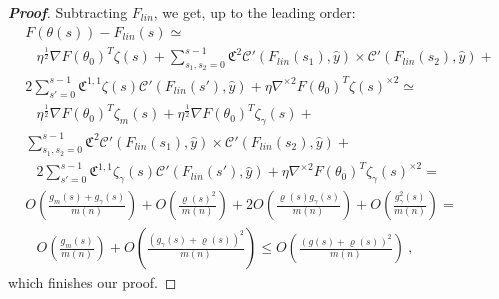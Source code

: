 \documentclass{article} %
\begin{document}
\begin{proof}[\textbf{Proof}]
Subtracting \(F_{lin}\), we get, up to the leading order:
\begin{equation}
\begin{array}{c}
F\left(\theta\left(s\right)\right)-F_{lin}\left(s\right)\simeq\\
\begin{array}{c}
\\
\\
\end{array}\eta^{\frac{1}{2}}\nabla F\left(\theta_{0}\right)^{T}\zeta\left(s\right)+\sum_{s_{1},s_{2}=0}^{s-1}\mathfrak{C}^{2}\mathcal{C}'\left(F_{lin}\left(s_{1}\right),\hat{y}\right)\times\mathcal{C}'\left(F_{lin}\left(s_{2}\right),\hat{y}\right)+\\
2\sum_{s'=0}^{s-1}\mathfrak{C}^{1,1}\zeta\left(s\right)\mathcal{C}'\left(F_{lin}\left(s'\right),\hat{y}\right)+\eta\nabla^{\times2}F\left(\theta_{0}\right)^{T}\zeta\left(s\right)^{\times2}\simeq\\
\begin{array}{c}
\\
\\
\end{array}\eta^{\frac{1}{2}}\nabla F\left(\theta_{0}\right)^{T}\zeta_{m}\left(s\right)+\eta^{\frac{1}{2}}\nabla F\left(\theta_{0}\right)^{T}\zeta_{\gamma}\left(s\right)+\\
\sum_{s_{1},s_{2}=0}^{s-1}\mathfrak{C}^{2}\mathcal{C}'\left(F_{lin}\left(s_{1}\right),\hat{y}\right)\times\mathcal{C}'\left(F_{lin}\left(s_{2}\right),\hat{y}\right)+\\
\begin{array}{c}
\\
\\
\end{array}2\sum_{s'=0}^{s-1}\mathfrak{C}^{1,1}\zeta_{\gamma}\left(s\right)\mathcal{C}'\left(F_{lin}\left(s'\right),\hat{y}\right)+\eta\nabla^{\times2}F\left(\theta_{0}\right)^{T}\zeta_{\gamma}\left(s\right)^{\times2}=\\
O\left(\frac{g_{m}\left(s\right)+g_{\gamma}\left(s\right)}{m\left(n\right)}\right)+O\left(\frac{\varrho\left(s\right)^{2}}{m\left(n\right)}\right)+2O\left(\frac{\varrho\left(s\right)g_{\gamma}\left(s\right)}{m\left(n\right)}\right)+O\left(\frac{g_{\gamma}^{2}\left(s\right)}{m\left(n\right)}\right)=\\
\begin{array}{c}
\\
\\
\end{array}O\left(\frac{g_{m}\left(s\right)}{m\left(n\right)}\right)+O\left(\frac{\left(g_{\gamma}\left(s\right)+\varrho\left(s\right)\right)^{2}}{m\left(n\right)}\right)\leq O\left(\frac{\left(g\left(s\right)+\varrho\left(s\right)\right)^{2}}{m\left(n\right)}\right) \ ,
\end{array}
\end{equation}
which finishes our proof.


\end{proof}
\end{document}
